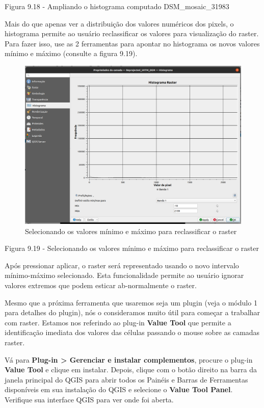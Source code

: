 \documentclass[
  portuguese,
]{krantz}
\begin{document}
Figura 9.18 - Ampliando o histograma computado DSM\_mosaic\_31983

Mais do que apenas ver a distribuição dos valores numéricos dos pixels, o histograma permite ao usuário reclassificar os valores para visualização do raster. Para fazer isso, use as 2 ferramentas para apontar no histograma os novos valores mínimo e máximo (consulte a figura 9.19).

\begin{figure}
\centering
\includegraphics{media/modulo9/fig919.png}
\caption{Selecionando os valores mínimo e máximo para reclassificar o raster}
\end{figure}

Figura 9.19 - Selecionando os valores mínimo e máximo para reclassificar o raster

Após pressionar aplicar, o raster será representado usando o novo intervalo mínimo-máximo selecionado. Esta funcionalidade permite ao usuário ignorar valores extremos que podem esticar ab-normalmente o raster.

Mesmo que a próxima ferramenta que usaremos seja um plugin (veja o módulo 1 para detalhes do plugin), nós o consideramos muito útil para começar a trabalhar com raster. Estamos nos referindo ao plug-in \textbf{Value Tool} que permite a identificação imediata dos valores das células passando o mouse sobre as camadas raster.

Vá para \textbf{Plug-in \textgreater{} Gerenciar e instalar complementos}, procure o plug-in \textbf{Value Tool} e clique em instalar. Depois, clique com o botão direito na barra da janela principal do QGIS para abrir todos os Painéis e Barras de Ferramentas disponíveis em sua instalação do QGIS e selecione o \textbf{Value Tool Panel}. Verifique sua interface QGIS para ver onde foi aberta.
\end{document}

